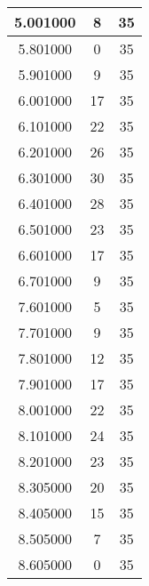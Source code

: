 \begin{longtable}[htbp]{|c|c|c|}
5.001000 & 8 & 35 \\ \hline
5.801000 & 0 & 35 \\ \hline
5.901000 & 9 & 35 \\ \hline
6.001000 & 17 & 35 \\ \hline
6.101000 & 22 & 35 \\ \hline
6.201000 & 26 & 35 \\ \hline
6.301000 & 30 & 35 \\ \hline
6.401000 & 28 & 35 \\ \hline
6.501000 & 23 & 35 \\ \hline
6.601000 & 17 & 35 \\ \hline
6.701000 & 9 & 35 \\ \hline
7.601000 & 5 & 35 \\ \hline
7.701000 & 9 & 35 \\ \hline
7.801000 & 12 & 35 \\ \hline
7.901000 & 17 & 35 \\ \hline
8.001000 & 22 & 35 \\ \hline
8.101000 & 24 & 35 \\ \hline
8.201000 & 23 & 35 \\ \hline
8.305000 & 20 & 35 \\ \hline
8.405000 & 15 & 35 \\ \hline
8.505000 & 7 & 35 \\ \hline
8.605000 & 0 & 35 \\ \hline
\end{longtable}
